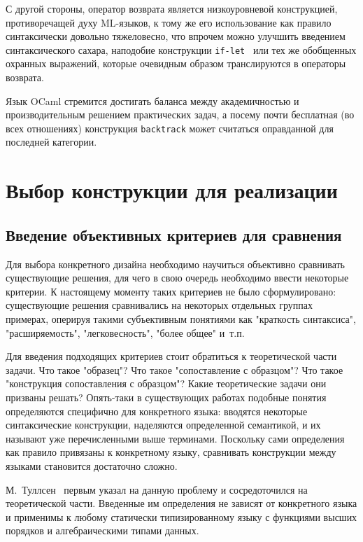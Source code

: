 С другой стороны, оператор возврата является низкоуровневой конструкцией, противоречащей духу ML-языков, к тому же его использование как правило синтаксически довольно тяжеловесно, что впрочем можно улучшить введением синтаксического сахара, наподобие конструкции \lstinline[language=none]|if-let|~\cite{ocaml_iflet} или тех же обобщенных охранных выражений, которые очевидным образом транслируются в операторы возврата.

Язык OCaml стремится достигать баланса между академичностью и производительным решением практических задач, а посему почти бесплатная (во всех отношениях) конструкция \lstinline|backtrack| может считаться оправданной для последней категории.

\section{Выбор конструкции для реализации} \label{sec:match_ext}

\subsection{Введение объективных критериев для сравнения} \label{sec:criteria_introduction}

Для выбора конкретного дизайна необходимо научиться объективно сравнивать существующие решения, для чего в свою очередь необходимо ввести некоторые критерии. К настоящему моменту таких критериев не было сформулировано: существующие решения сравнивались на некоторых отдельных группах примерах, оперируя такими субъективным понятиями как "краткость синтаксиса", "расширяемость", "легковесность", "более общее" и~т.п.

Для введения подходящих критериев стоит обратиться к теоретической части задачи. Что такое "образец"? Что такое "сопоставление с образцом"? Что такое "конструкция сопоставления с образцом"? Какие теоретические задачи они призваны решать? Опять-таки в существующих работах подобные понятия определяются специфично для конкретного языка: вводятся некоторые синтаксические конструкции, наделяются определенной семантикой, и их называют уже перечисленными выше терминами. Поскольку сами определения как правило привязаны к конкретному языку, сравнивать конструкции между языками становится достаточно сложно. 

М.~Туллсен~\cite{tullsen2000firstclass} первым указал на данную проблему и сосредоточился на теоретической части. Введенные им определения не зависят от конкретного языка и применимы к любому статически типизированному языку с функциями высших порядков и алгебраическими типами данных. 

